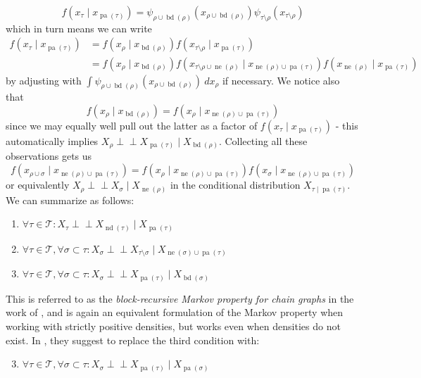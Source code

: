 \documentclass[11pt, a4paper]{memoir}
\theoremstyle{break}
\theoremstyle{break}
\theoremstyle{nonumberplain}
\newcommand{\indep}{\perp \!\!\! \perp}
\DeclareMathOperator{\pa}{pa}
\DeclareMathOperator{\nei}{ne}
\DeclareMathOperator{\bd}{bd}
\DeclareMathOperator{\nd}{nd}
\begin{document}
\begin{equation}\label{fact}
f\left(x_\tau\mid x_{\pa(\tau)}\right)=\psi_{\rho\cup\bd(\rho)}(x_{\rho\cup\bd(\rho)})\psi_{\tau\setminus \rho}(x_{\tau\setminus \rho})
\end{equation}
which in turn means we can write
\begin{align*}
f\left(x_\tau\mid x_{\pa(\tau)}\right)&=f\left(x_\rho\mid x_{\bd(\rho)}\right)f\left(x_{\tau\setminus\rho}\mid x_{\pa(\tau)}\right)\\
&=f\left(x_\rho\mid x_{\bd(\rho)}\right)f\left(x_{\tau\setminus\rho\cup\nei(\rho)}\mid x_{\nei(\rho)\cup\pa(\tau)}\right)f\left(x_{\nei(\rho)}\mid x_{\pa(\tau)}\right)
\end{align*}
by adjusting with $\int \psi_{\rho\cup\bd(\rho)}(x_{\rho\cup\bd(\rho)})\ dx_\rho$ if necessary. We notice also that $$f\left(x_\rho\mid x_{\bd(\rho)}\right)=f\left(x_\rho\mid x_{\nei(\rho)\cup\pa(\tau)}\right)$$
since we may equally well pull out the latter as a factor of $f\left(x_\tau\mid x_{\pa(\tau)}\right)$ - this automatically implies $X_\rho\indep X_{\pa(\tau)}\mid X_{\bd(\rho)}$. Collecting all these observations gets us
$$f\left(x_{\rho\cup\sigma}\mid x_{\nei(\rho)\cup \pa(\tau)}\right)=f\left(x_{\rho}\mid x_{\nei(\rho)\cup\pa(\tau)}\right)f\left(x_{\sigma}\mid x_{\nei(\rho)\cup\pa(\tau)}\right)$$
or equivalently $X_\rho\indep X_\sigma\mid X_{\nei(\rho)}$ in the conditional distribution $X_{\tau\mid \pa(\tau)}$. We can summarize as follows:
\begin{enumerate}[label=(\roman*)]
	\item $\forall \tau\in \mathscr{T}: X_\tau\indep X_{\nd(\tau)}\mid X_{\pa(\tau)}$
	\item $\forall \tau\in \mathscr{T},\forall \sigma\subset \tau: X_\sigma\indep X_{\tau\setminus \sigma}\mid X_{\nei(\sigma)\cup\pa(\tau)}$
	\item $\forall \tau\in \mathscr{T},\forall \sigma\subset \tau: X_\sigma\indep X_{\pa(\tau)}\mid X_{\bd(\sigma)}$
\end{enumerate}
This is referred to as the \emph{block-recursive Markov property for chain graphs}	in the work of \cite{AMP}, and is again an equivalent formulation of the Markov property when working with strictly positive densities, but works even when densities do not exist. In \cite{AMP}, they suggest to replace the third condition with:
\begin{enumerate}[label=(\roman*)*]
\setcounter{enumi}{2}
	\item $\forall \tau\in \mathscr{T},\forall \sigma\subset \tau: X_\sigma\indep X_{\pa(\tau)}\mid X_{\pa(\sigma)}$
\end{enumerate}
\end{document}
